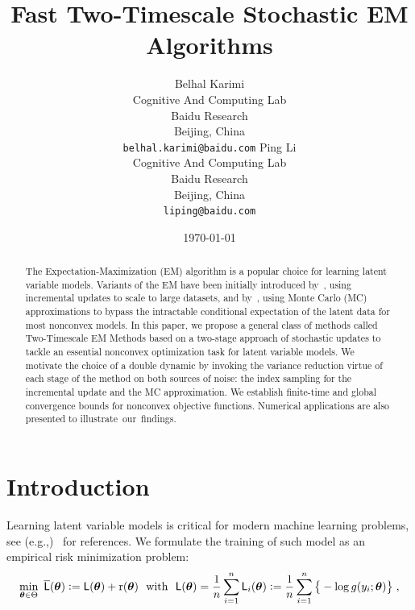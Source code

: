 \documentclass[11pt]{article}
\theoremstyle{t}
\begin{document}
\title{\vspace{-0.1in}Fast Two-Timescale Stochastic EM Algorithms\vspace{-0.2in}}
\author{
  Belhal Karimi \\
  Cognitive And Computing Lab\\
  Baidu Research\\
  Beijing, China \\
  \texttt{belhal.karimi@baidu.com} 
   \And
  Ping Li \\
  Cognitive And Computing Lab\\
  Baidu Research\\
  Beijing, China \\
  \texttt{liping@baidu.com} }
\date{\today}

\maketitle

\begin{abstract}\vspace{-0.1in}
The Expectation-Maximization (EM) algorithm is a popular choice for learning latent variable models. 
Variants of the EM have been initially introduced by~\citep{neal1998view}, using incremental updates to scale to large datasets, and by~\citep{wei1990monte, delyon1999}, using Monte Carlo (MC) approximations to bypass the intractable conditional expectation of the latent data for most nonconvex models.
In this paper, we propose a general class of methods called Two-Timescale EM Methods based on a two-stage approach of stochastic updates to tackle an essential nonconvex optimization task for latent variable models.
We motivate the choice of a double dynamic by invoking the variance reduction virtue of each stage of the method on both sources of noise: the index sampling for the incremental update and the MC approximation.
We establish finite-time and global convergence bounds for nonconvex objective functions.
Numerical applications are also presented to illustrate~our~findings.
\end{abstract}

\vspace{-0.05in}
\section{Introduction}
\vspace{-0.05in}

Learning latent variable models is critical for modern machine learning problems, see (e.g.,)~\citep{mclachlan2007algorithm} for references.
We formulate the training of such model as an empirical risk minimization problem:
\begin{align} \label{eq:em_motivate}
\min_{ \param \in \Param }~ \overline{\calL} ( \param ) \eqdef  \calL ( \param ) + \Pen (\param)~~\text{with}~~\calL ( \param ) = \frac{1}{n} \sum_{i=1}^n \calL_i( \param) \eqdef  \frac{1}{n} \sum_{i=1}^n \big\{ - \log g( y_i ; \param ) \big\}\eqs,
\end{align}
\end{document}
